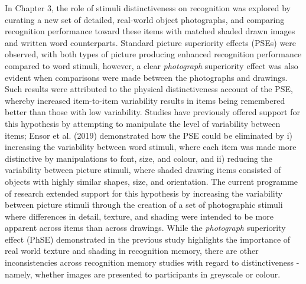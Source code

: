 \documentclass[
  11pt,
]{article}
\begin{document}
In Chapter 3, the role of stimuli distinctiveness on recognition was
explored by curating a new set of detailed, real-world object
photographs, and comparing recognition performance toward these items
with matched shaded drawn images and written word counterparts. Standard
picture superiority effects (PSEs) were observed, with both types of
picture producing enhanced recognition performance compared to word
stimuli, however, a clear \emph{photograph} superiority effect was also
evident when comparisons were made between the photographs and drawings.
Such results were attributed to the physical distinctiveness account of
the PSE, whereby increased item-to-item variability results in items
being remembered better than those with low variability. Studies have
previously offered support for this hypothesis by attempting to
manipulate the level of variability between items; Ensor et al. (2019)
demonstrated how the PSE could be eliminated by i) increasing the
variability between word stimuli, where each item was made more
distinctive by manipulations to font, size, and colour, and ii) reducing
the variability between picture stimuli, where shaded drawing items
consisted of objects with highly similar shapes, size, and orientation.
The current programme of research extended support for this hypothesis
by increasing the variability between picture stimuli through the
creation of a set of photographic stimuli where differences in detail,
texture, and shading were intended to be more apparent across items than
across drawings. While the \emph{photograph} superiority effect (PhSE)
demonstrated in the previous study highlights the importance of real
world texture and shading in recognition memory, there are other
inconsistencies across recognition memory studies with regard to
distinctiveness - namely, whether images are presented to participants
in greyscale or colour.
\end{document}
